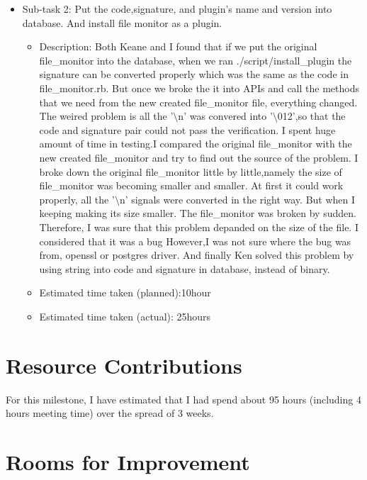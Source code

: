 \begin{itemize}
     \begin{itemize}
            \item Sub-task 2: Put the code,signature, and plugin's name and version into database. And install                  file monitor as a plugin.
	            \begin{itemize}
				    \item Description: Both Keane and I found that if we put the original file\_monitor into the database, when we ran ./script/install\_plugin the signature can be converted properly which was the same as the code in file\_monitor.rb. But once we broke the it into APIs and call the methods that we need from the new created file\_monitor file, everything changed. The weired problem is all the '$\setminus$n' was convered into '$\setminus$012',so that the code and signature pair could not pass the verification. I spent huge amount of time in testing.I compared the original file\_monitor with the new created file\_monitor and try to find out the source of the problem. I broke down the original file\_monitor little by little,namely the size of file\_monitor was becoming smaller and smaller. At first it could work properly, all the '$\setminus$n' signals were converted in the right way. But when I keeping making its size smaller. The file\_monitor was broken by sudden. Therefore, I was sure that this problem depanded on the size of the file. I considered that it was a bug 
                                   However,I was not sure where the bug was from, openssl or postgres driver. And finally Ken solved this problem by using string into code and signature in database, instead of binary.
					\item Estimated time taken (planned):10hour
					\item Estimated time taken (actual): 25hours
		     \end{itemize}
                     \end{itemize}
  \end{itemize}

\section*{Resource Contributions}

For this milestone, I have estimated that I had spend about 95 hours (including 4 hours meeting time) over the spread of 3 weeks.

\section*{Rooms for Improvement}

